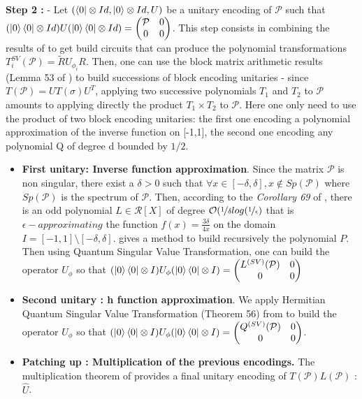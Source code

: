 \documentclass[sn-mathphys]{sn-jnl}%
\theoremstyle{thmstyleone}%
\theoremstyle{thmstyletwo}%
\theoremstyle{thmstylethree}%
\begin{document}
\textbf{Step 2 :} - Let $(\bra{0} \otimes Id, \ket{0} \otimes Id, U) $
be a unitary encoding of $\mathcal{P}$ such that
$(\ket{0}\bra{0} \otimes Id) U (\ket{0}\bra{0} \otimes Id)
= \begin{pmatrix} \mathcal{P} & 0 \\ 0 & 0 \end{pmatrix}$. This step
consists in combining the results of \cite{gilyen_su_low_wiebe_2019}
to get build circuits that can produce the polynomial transformations
$T_i^{SV}(\mathcal{P}) = \widetilde{R} U_{\phi_i} R$. Then, one can
use the block matrix arithmetic results (Lemma 53 of
\cite{gilyen_su_low_wiebe_2019}) to build successions of block
encoding unitaries - since $T(\mathcal{P}) = U T(\sigma) U^T$,
applying two successive polynomials $T_1$ and $T_2$ to $\mathcal{P}$
amounts to applying directly the product $T_1 \times T_2$ to
$\mathcal{P}$. Here one only need to use the product of two block
encoding unitaries: the first one encoding a polynomial approximation
of the inverse function on [-1,1], the second one encoding any
polynomial Q of degree d bounded by $1/2$.

\begin{itemize}
\item \textbf{First unitary: Inverse function approximation}. Since
  the matrix $\mathcal{P}$ is non singular, there exist a $\delta>0$
  such that
  $\forall x \in [-\delta, \delta], x \not\in Sp(\mathcal{P})$ where
  $Sp(\mathcal{P})$ is the spectrum of $\mathcal{P}$. Then, according
  to the \textit{Corollary 69} of \cite{gilyen_su_low_wiebe_2019},
  there is an odd polynomial $L \in \mathcal{R}[X]$ of degree
  $\mathcal{O}(\nicefrac{1}{\delta} log(\nicefrac{1}{\epsilon})$ that
  is $\epsilon-approximating$ the function
  $f(x) = \frac{3\delta}{4 x}$ on the domain
  $I = [-1, 1] \setminus [-\delta,
  \delta]$. \cite{gilyen_su_low_wiebe_2019} gives a method to build
  recursively the polynomial $P$. Then using Quantum Singular Value
  Transformation, one can build the operator $U_{\phi}$ so that
  $(\ket{0}\bra{0} \otimes I)U_{\phi}(\ket{0}\bra{0} \otimes I)
  = \begin{pmatrix} L^{(SV)}(\mathcal{P}) & 0 \\ 0 & 0 \end{pmatrix}$
\item \textbf{Second unitary : h function approximation}. We apply
  Hermitian Quantum Singular Value Transformation (Theorem 56) from
  \cite{gilyen_su_low_wiebe_2019} to build the operator $U_{\phi}$ so
  that
  $(\ket{0}\bra{0} \otimes I)U_\phi (\ket{0}\bra{0} \otimes I)
  = \begin{pmatrix} Q^{(SV)}(\mathcal{P}) & 0 \\ 0 & 0 \end{pmatrix}$.
    
\item \textbf{Patching up : Multiplication of the previous encodings.}
  The multiplication theorem of \cite{gilyen_su_low_wiebe_2019}
  provides a final unitary encoding of $T(\mathcal{P}) L(\mathcal{P})$
  : $\widehat{U}$.
    
\end{itemize}
\end{document}
